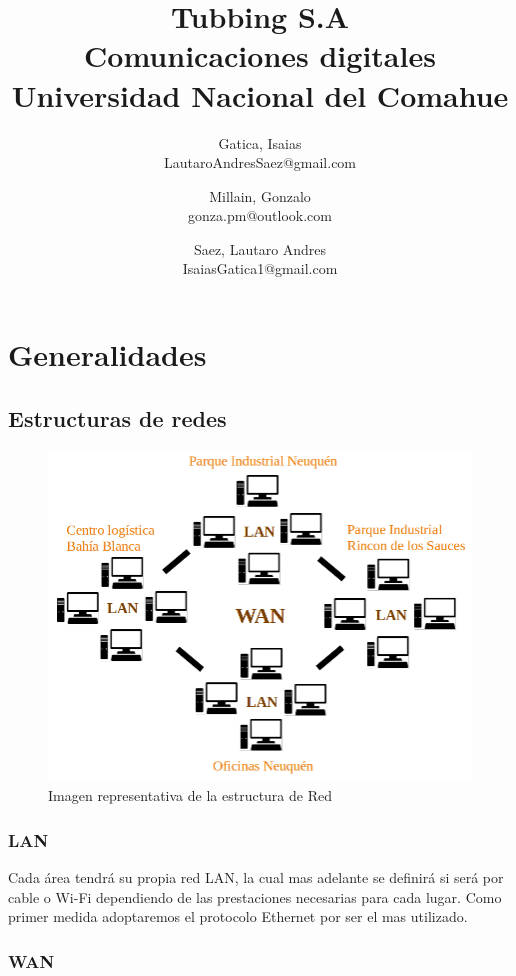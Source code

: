 \documentclass[11pt]{article}
\title{Tubbing S.A \\ \small{Comunicaciones digitales} \\ \small{Universidad Nacional del Comahue} }
\author{ 
        Gatica, Isaias \\ \small{LautaroAndresSaez@gmail.com} \and 
        Millain, Gonzalo \\ \small{gonza.pm@outlook.com} \and
        Saez, Lautaro Andres \\ \small{IsaiasGatica1@gmail.com} 
}
\date{}
\begin{document}
    \maketitle
    \section{Generalidades}
    
        \subsection{Estructuras de redes}
        \begin{figure}[H]
            \centering
            \includegraphics[scale=0.5]{Figure/Tubbin_Estructura.PNG}
            \caption{Imagen representativa de la estructura de Red}
            \label{Estructura}
        \end{figure}


        \subsubsection*{LAN}

        Cada área tendrá su propia red LAN, la cual mas adelante se definirá si será por cable o Wi-Fi dependiendo de las 
        prestaciones necesarias para cada lugar. Como primer medida adoptaremos el protocolo Ethernet por ser el mas utilizado.

        \subsubsection*{WAN}
\end{document}
